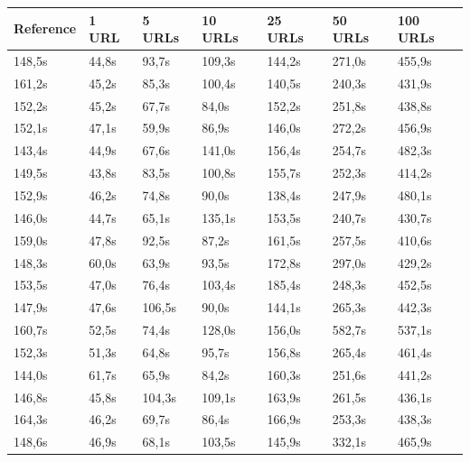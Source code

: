 \documentclass{scrartcl}
\begin{document}
\begin{table}[h]
\begin{tabular}{@{}lllllll@{}}
\toprule
Reference & 1 URL      & 5 URLs     & 10 URLs     & 25 URLs     & 50 URLs     & 100 URLs     \\ \midrule
148,5s    & 44,8s      & 93,7s      & 109,3s      & 144,2s      & 271,0s      & 455,9s       \\
161,2s    & 45,2s      & 85,3s      & 100,4s      & 140,5s      & 240,3s      & 431,9s       \\
152,2s    & 45,2s      & 67,7s      & 84,0s       & 152,2s      & 251,8s      & 438,8s       \\
152,1s    & 47,1s      & 59,9s      & 86,9s       & 146,0s      & 272,2s      & 456,9s       \\
143,4s    & 44,9s      & 67,6s      & 141,0s      & 156,4s      & 254,7s      & 482,3s       \\
149,5s    & 43,8s      & 83,5s      & 100,8s      & 155,7s      & 252,3s      & 414,2s       \\
152,9s    & 46,2s      & 74,8s      & 90,0s       & 138,4s      & 247,9s      & 480,1s       \\
146,0s    & 44,7s      & 65,1s      & 135,1s      & 153,5s      & 240,7s      & 430,7s       \\
159,0s    & 47,8s      & 92,5s      & 87,2s       & 161,5s      & 257,5s      & 410,6s       \\
148,3s    & 60,0s      & 63,9s      & 93,5s       & 172,8s      & 297,0s      & 429,2s       \\
153,5s    & 47,0s      & 76,4s      & 103,4s      & 185,4s      & 248,3s      & 452,5s       \\
147,9s    & 47,6s      & 106,5s     & 90,0s       & 144,1s      & 265,3s      & 442,3s       \\
160,7s    & 52,5s      & 74,4s      & 128,0s      & 156,0s      & 582,7s      & 537,1s       \\
152,3s    & 51,3s      & 64,8s      & 95,7s       & 156,8s      & 265,4s      & 461,4s       \\
144,0s    & 61,7s      & 65,9s      & 84,2s       & 160,3s      & 251,6s      & 441,2s       \\
146,8s    & 45,8s      & 104,3s     & 109,1s      & 163,9s      & 261,5s      & 436,1s       \\
164,3s    & 46,2s      & 69,7s      & 86,4s       & 166,9s      & 253,3s      & 438,3s       \\
148,6s    & 46,9s      & 68,1s      & 103,5s      & 145,9s      & 332,1s      & 465,9s       \\

\end{tabular}
\end{table}
\end{document}
